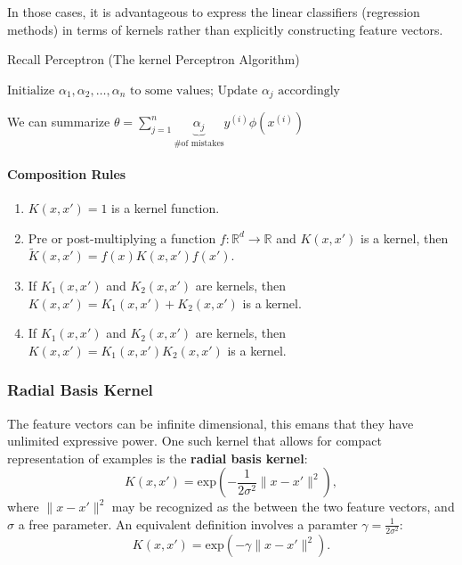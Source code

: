 \documentclass{article}
\begin{document}
In those cases, it is advantageous to express the linear classifiers (regression methods) in terms of kernels rather than explicitly constructing feature vectors.

\begin{algorithm}
\caption{Recall Perceptron (The kernel Perceptron Algorithm)}
\begin{algorithmic}
	\State $\text{Initialize }\alpha_1,\alpha_2,\ldots,\alpha_n\text{ to some values;}$
	\State $\text{Update }\alpha_j\text{ accordingly}$
	\EndIf
	\EndFor
	\EndFor
	\EndProcedure
\end{algorithmic}
\end{algorithm}

We can summarize $\theta=\sum\limits_{j=1}^n\underbrace{\alpha_j}_{\text{\# of mistakes}} y^{(i)}\phi(x^{(i)})$

\paragraph{Composition Rules}
\begin{enumerate}
	\item $K(x,x')=1$ is a kernel function.
	\item Pre or post-multiplying a function $f:\mathbb{R}^d\rightarrow\mathbb{R}$ and $K(x,x')$ is a kernel, then $\tilde{K}(x,x')=f(x)K(x,x')f(x')$.
	\item If $K_1(x,x')$ and $K_2(x,x')$ are kernels, then $K(x,x')=K_1(x,x')+K_2(x,x')$ is a kernel.
	\item If $K_1(x,x')$ and $K_2(x,x')$ are kernels, then $K(x,x')=K_1(x,x')K_2(x,x')$ is a kernel.
\end{enumerate}

\subsubsection{Radial Basis Kernel}
The feature vectors can be infinite dimensional, this emans that they have unlimited expressive power. One such kernel that allows for compact representation of examples is the \textbf{radial basis kernel}:
\[K(x,x')=\text{exp}\left(-\frac{1}{2\sigma^2}\lVert x-x'\rVert^2\right),\]
where $\lVert x-x'\rVert^2$ may be recognized as the  between the two feature vectors, and $\sigma$ a free parameter. An equivalent definition involves a paramter $\gamma=\frac{1}{2\sigma^2}$:
\[K(x,x')=\text{exp}(-\gamma\lVert x-x'\rVert^2).\]
\end{document}
